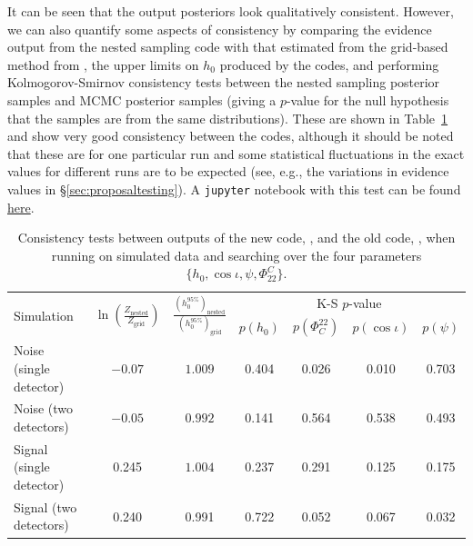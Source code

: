 It can be seen that the output posteriors look qualitatively consistent. However, we can also quantify some aspects of consistency by
comparing the evidence output from the nested sampling code with that estimated from the grid-based method from \lppe, the upper limits
on $h_0$ produced by the codes, and performing Kolmogorov-Smirnov consistency tests between the nested sampling posterior samples
and MCMC posterior samples (giving a $p$-value for the null hypothesis that the samples are from the same distributions).
These are shown in Table~\ref{tab:codeeval} and show very good consistency between the codes, although it should be noted that
these are for one particular run and some statistical fluctuations in the exact values for different runs are to be expected (see, e.g.,
the variations in evidence values in \S\ref{sec:proposaltesting}). A {\tt jupyter} notebook with this test can be found \href{https://github.com/mattpitkin/CW_nested_sampling_doc/blob/master/figures/codeeval/simulations/noise/SimulatedNoiseTestsPaper.ipynb}{here}.

\begin{table}[hptb]
\caption{Consistency tests between outputs of the new code, \lppen, and the old code, \lppe, when running on simulated data
and searching over the four parameters $\{h_0, \cos{\iota}, \psi, \Phi_{22}^C\}$.\label{tab:codeeval}}
\begin{center}
\begin{tabular}{l c c | c c c c}
\hline
\multirow{2}{*}{Simulation} & \multirow{2}{*}{$\ln{\left(\frac{Z_{\text{nested}}}{Z_{\text{grid}}}\right)}$} & \multirow{2}{*}{$\frac{(h_0^{95\%})_{\text{nested}}}{(h_0^{95\%})_{\text{grid}}}$} & 
\multicolumn{4}{c}{K-S $p$-value} \\ \cline{4-7}
 &  &  & $p(h_0)$ & $p(\Phi_C^{22})$ & $p(\cos{\iota})$ & $p(\psi)$ \\                      
\hline
\hline
Noise (single detector)  & $-0.07$ & $1.009$ & 0.404 & 0.026 & 0.010 & 0.703 \\
Noise (two detectors)    & $-0.05$ & $0.992$ & 0.141 & 0.564 & 0.538 & 0.493 \\
Signal (single detector) & 0.245   & $1.004$ & 0.237 & 0.291 & 0.125 & 0.175 \\
Signal (two detectors)   & 0.240   & 0.991   & 0.722 & 0.052 & 0.067 & 0.032 \\
\hline
\end{tabular}
\end{center}
\end{table}

